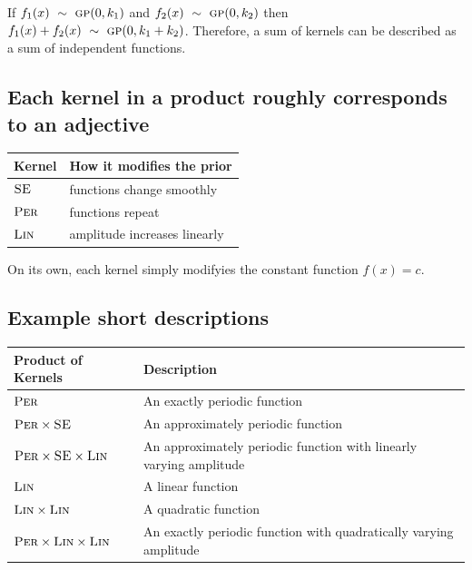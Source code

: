 \documentclass[landscape,a0b,final,a4resizeable]{a0poster}
\newenvironment{poster}{
  \begin{center}
  \begin{minipage}[c]{0.96\textwidth}
}{
  \end{minipage} 
  \end{center}
}
\begin{document}
\begin{poster}
\begin{multicols}{3}
\vspace{1.5\baselineskip}

If $f_1(x) \ \sim\  {\textsc{gp}}{}(0, k_1)$ and $f_2(x) \ \sim\  {\textsc{gp}}{}(0, k_2)$ then $f_1(x) + f_2(x) \ \sim\  {\textsc{gp}}{}(0, k_1 + k_2)$.
Therefore, a sum of kernels can be described as a sum of independent functions.
%





\subsection*{Each kernel in a product roughly corresponds to an adjective}


\vspace{1\baselineskip}

\centering
\begin{tabular}{l|l}
Kernel & How it modifies the prior \\
\midrule
$\textsc{SE}$ & functions change smoothly \\
${\textsc{Per}}$ & functions repeat \\
${\textsc{Lin}}$ & amplitude increases linearly
\end{tabular}

\vspace{1\baselineskip}

On its own, each kernel simply modifyies the constant function $f(x) = c$.



\subsection*{Example short descriptions}

\centering
\begin{tabular}{l|l}
Product of Kernels & Description \\
\midrule
${\textsc{Per}}$ & An exactly periodic function \\
${\textsc{Per}} \times {\textsc{SE}}$ & An approximately periodic function \\
${\textsc{Per}} \times {\textsc{SE}} \times {\textsc{Lin}}$ & An approximately periodic function with linearly varying amplitude \\
${\textsc{Lin}}$ & A linear function \\
${\textsc{Lin}} \times {\textsc{Lin}}$ & A quadratic function \\
${\textsc{Per}} \times {\textsc{Lin}} \times {\textsc{Lin}}$ & An exactly periodic function with quadratically varying amplitude\\
\end{tabular}


\end{multicols}
\end{poster}
\end{document}
